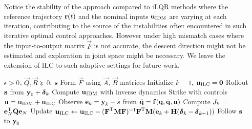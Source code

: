 
Notice the stability of the approach compared to iLQR methods where the reference trajectory $\boldsymbol{\mathrm{r}}(t)$ and the nominal inputs $\boldsymbol{\mathrm{u}}_{\mathrm{IDM}}$ are varying at each iteration, contributing to the source of the instabilities often encountered in such iterative optimal control approaches. However under high mismatch cases where the input-to-output matrix $\vec{F}$ is not accurate, the descent direction might not be estimated and exploration in joint space might be necessary. We leave the extension of ILC to such adaptive settings for future work.

\begin{algorithm}[tb]
   \caption{\alg}
   \label{alg1}
\begin{algorithmic}
    $\epsilon > 0$, $\vec{Q}, \vec{R} \succeq 0$, $\boldsymbol{\mathrm{s}}$ 
   \STATE Form $\vec{F}$ using $\vec{A}$, $\vec{B}$ matrices
   \STATE Initialize $k = 1$, $\boldsymbol{\mathrm{u}}_{\mathrm{ILC}} = \boldsymbol{\mathrm{0}}$
   \REPEAT 
   	   \STATE Rollout $\boldsymbol{\mathrm{s}}$ from $\boldsymbol{\mathrm{y}}_0 + \boldsymbol{\mathrm{\delta}}_k$ 
   	   \STATE Compute $\boldsymbol{\mathrm{u}}_{\mathrm{IDM}}$ with inverse dynamics
 	   \STATE Strike with controls $\boldsymbol{\mathrm{u}} = \boldsymbol{\mathrm{u}}_{\mathrm{IDM}} + \boldsymbol{\mathrm{u}}_{\mathrm{ILC}}$  %
 	   \STATE Observe $\boldsymbol{\mathrm{e}}_k = \boldsymbol{\mathrm{y}}_k - s$ from $\ddot{\boldsymbol{\mathrm{q}}} = \boldsymbol{\mathrm{f}}(\boldsymbol{\mathrm{q}},\dot{\boldsymbol{\mathrm{q}}},\boldsymbol{\mathrm{u}})$
 	   \STATE Compute $J_k$ = $\boldsymbol{\mathrm{e}}_N^{\mathrm{T}}\boldsymbol{\mathrm{Q}}\boldsymbol{\mathrm{e}}_N$
 	   \STATE Update $\boldsymbol{\mathrm{u}}_{\mathrm{ILC}} \leftarrow \boldsymbol{\mathrm{u}}_{\mathrm{ILC}} - (\boldsymbol{\mathrm{F}}^{\mathrm{T}}\boldsymbol{\mathrm{M}}\boldsymbol{\mathrm{F}})^{-1}\boldsymbol{\mathrm{F}}^{\mathrm{T}}\boldsymbol{\mathrm{M}}(\boldsymbol{\mathrm{e}}_k + \boldsymbol{\mathrm{H}}(\boldsymbol{\mathrm{\delta}}_k - \boldsymbol{\mathrm{\delta}}_{k+1}))$
 	   \STATE Follow $\boldsymbol{\mathrm{s}}$ to $\boldsymbol{\mathrm{y}}_0$
\end{algorithmic}
\end{algorithm}